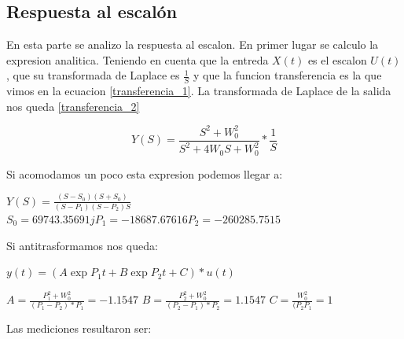\documentclass[12pt,a4paper]{article}
\begin{document}
\subsection{Respuesta al escalón}
En esta parte se analizo la respuesta al escalon. En primer lugar se calculo la expresion analitica. Teniendo en cuenta que 
la entreda $X(t)$ es el escalon $U(t)$, que su transformada de Laplace es $\frac{1}{S}$ y que la funcion transferencia es la que 
vimos en la ecuacion \ref{transferencia_1}. La transformada de Laplace de la salida nos queda \ref{transferencia_2}


\begin{equation} Y(S) = \frac{S^2+W_{0}^2}{S^2+4W_{0}S+W_{0}^2} * \frac{1}{S}  \label{transferencia_2}\end{equation}

Si acomodamos un poco esta expresion podemos llegar a: \\

\begin{center}
    $Y(S) = \frac{(S-S_{0})(S+S_{0})}{(S-P_{1})(S-P_{2})S}$  \\
    
    $S_{0}=69743.35691j
    P_{1}=-18687.67616
    P_{2}=-260285.7515$
    \end{center}

Si antitrasformamos nos queda:\\

\begin{center}
    $y(t) = (A\exp{P_{1}t}+B\exp{P_{2}t}+C) * u(t)$

    $A = \frac{P_{1}^2 + W_{0}^2}{(P_{1}-P_{2})*P_{1}} = -1.1547$
    $B = \frac{P_{2}^2 + W_{0}^2}{(P_{2}-P_{1})*P_{2}} =  1.1547$
    $C = \frac{W_{0}^2}{(P_{2}P_{1}} = 1$

    \end{center}



Las mediciones resultaron ser:
\end{document}
